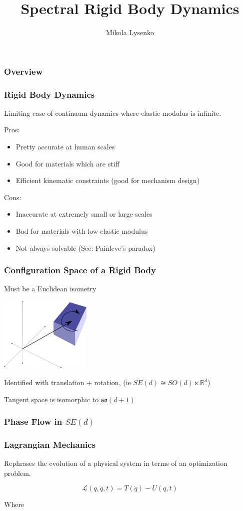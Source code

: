 \documentclass{beamer}
\title{Spectral Rigid Body Dynamics}
\author{Mikola Lysenko}
\begin{document}
\newcommand{\R}{\mathbb{R}}

\maketitle

\begin{frame}
\frametitle{Overview}
\end{frame}

\begin{frame}
\frametitle{Rigid Body Dynamics}
Limiting case of continuum dynamics where elastic modulus is infinite.

Pros:
\begin{itemize}
\item Pretty accurate at human scales
\item Good for materials which are stiff
\item Efficient kinematic constraints (good for mechanism design)
\end{itemize}

Cons:
\begin{itemize}
\item Inaccurate at extremely small or large scales
\item Bad for materials with low elastic modulus
\item Not always solvable (See: Painleve's paradox)
\end{itemize}

\end{frame}

\begin{frame}
\frametitle{Configuration Space of a Rigid Body}
Must be a Euclidean isometry

\begin{center}
\includegraphics[height=1.4in]{figures/rigid_body.png}
\end{center}

Identified with translation + rotation, (ie $SE(d) \cong SO(d) \ltimes \R^d$)

Tangent space is isomorphic to $\mathfrak{so}(d+1)$


\end{frame}

\begin{frame}
\frametitle{Phase Flow in $SE(d)$}


\end{frame}

\begin{frame}
\frametitle{Lagrangian Mechanics}

Rephrases the evolution of a physical system in terms of an optimization problem.

\[ \mathcal{L}(q, \dot{q}, t) = T(\dot{q}) - U(q, t) \]

Where
\end{frame}
\end{document}
